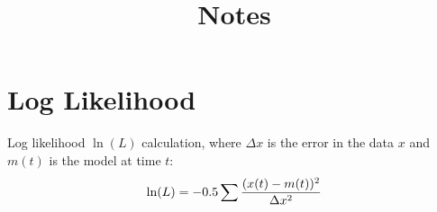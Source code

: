 \documentclass{article}
\title{Notes}
\begin{document}
\maketitle

\section{Log Likelihood}

Log likelihood $\ln(L)$ calculation, where $\Delta x$ is the error in the data
$x$ and $m(t)$ is the model at time $t$:
\begin{equation}
    \ln(L) = -0.5 \sum {({x(t) - m(t))^2} \over {\Delta x^2}}
\end{equation}
\end{document}
